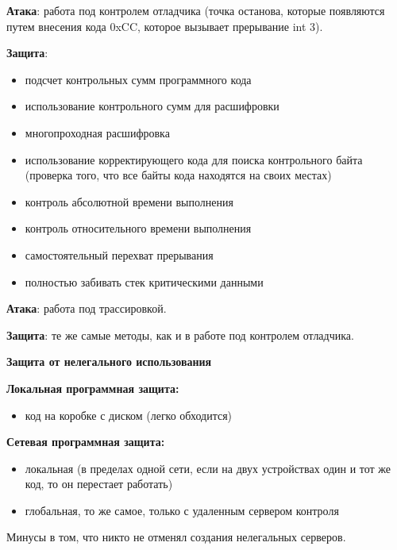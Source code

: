 \documentclass[bachelor, och, pract]{SCWorks}
\theoremstyle{remark}
\begin{document}
    \textbf{Атака}: работа под контролем отладчика (точка останова, которые появляются путем внесения кода 0xCC, которое вызывает прерывание int 3).
    
    \textbf{Защита}:

    \begin{itemize}[label=$\bullet$]
        \item подсчет контрольных сумм программного кода
        \item использование контрольного сумм для расшифровки
        \item многопроходная расшифровка
        \item использование корректирующего кода для поиска контрольного байта (проверка того, что все байты кода находятся на своих местах)
        \item контроль абсолютной времени выполнения
        \item контроль относительного времени выполнения
        \item самостоятельный перехват прерывания
        \item полностью забивать стек критическими данными 
    \end{itemize}
    \hfill \break

    \textbf{Атака}: работа под трассировкой.
    
    \textbf{Защита}: те же самые методы, как и в работе под контролем отладчика.

    \hfill \break
    \hfill \break
    \begin{center}
        \textbf{Защита от нелегального использования}
    \end{center}

    \textbf{Локальная программная защита:} 

    \begin{itemize}[label=$\bullet$]
        \item код на коробке с диском (легко обходится)
    \end{itemize}

    \textbf{Сетевая программная защита:} 
    
    \begin{itemize}[label=$\bullet$]
        \item локальная (в пределах одной сети, если на двух устройствах один и тот же код, то он перестает работать)
        \item глобальная, то же самое, только с удаленным сервером контроля
    \end{itemize}
    Минусы в том, что никто не отменял создания нелегальных серверов.
\end{document}
